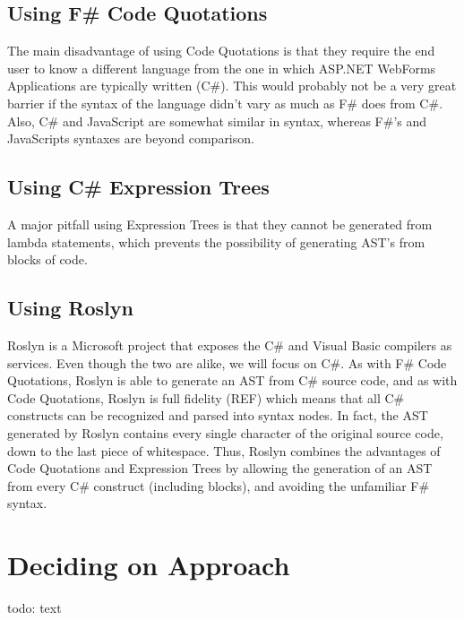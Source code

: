 		\subsection{Using F\# Code Quotations} %
		\label{sub:using_fs_code_quotations}
			The main disadvantage of using Code Quotations is that they require the end user to know a different language from the one in which ASP.NET WebForms Applications are typically written (C\#). This would probably not be a very great barrier if the syntax of the language didn't vary as much as F\# does from C\#. Also, C\# and JavaScript are somewhat similar in syntax, whereas F\#'s and JavaScripts syntaxes are beyond comparison.

		\subsection{Using C\# Expression Trees} %
		\label{sub:using_cs_expression_trees}
			A major pitfall using Expression Trees is that they cannot be generated from lambda statements, which prevents the possibility of generating AST’s from blocks of code.

		\subsection{Using Roslyn} %
		\label{sub:using_roslyn}
			Roslyn is a Microsoft project that exposes the C\# and Visual Basic compilers as services. Even though the two are alike, we will focus on C\#. As with F\# Code Quotations, Roslyn is able to generate an AST from C\# source code, and as with Code Quotations, Roslyn is full fidelity (REF) which means that all C\# constructs can be recognized and parsed into syntax nodes. In fact, the AST generated by Roslyn contains every single character of the original source code, down to the last piece of whitespace. Thus, Roslyn combines the advantages of Code Quotations and Expression Trees by allowing the generation of an AST from every C\# construct (including blocks), and avoiding the unfamiliar F\# syntax.


\section{Deciding on Approach} %
\label{sec:deciding_on_approach}
	todo: text


